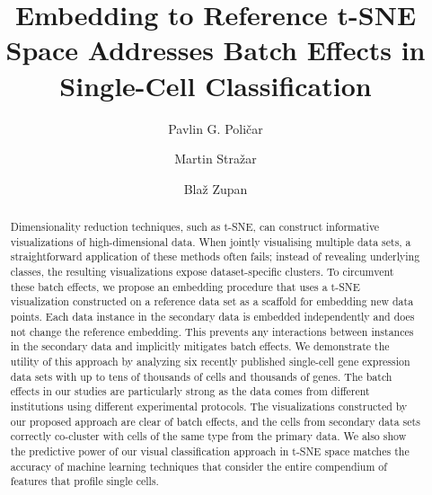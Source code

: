 \documentclass[runningheads]{llncs}
\begin{document}
%
\title{Embedding to Reference t-SNE Space Addresses Batch Effects in Single-Cell Classification}
%
%
\author{Pavlin G. Poli\v{c}ar \and
Martin Stra\v{z}ar \and
Bla\v{z} Zupan}
%
%

\maketitle

\begin{abstract}

Dimensionality reduction techniques, such as t-SNE, can construct informative visualizations of high-dimensional data. When jointly visualising multiple data sets, a straightforward application of these methods often fails; instead of revealing underlying classes, the resulting visualizations expose dataset-specific clusters. To circumvent these batch effects, we propose an embedding procedure that uses a t-SNE visualization constructed on a reference data set as a scaffold for embedding new data points. Each data instance in the secondary data is embedded independently and does not change the reference embedding. This prevents any interactions between instances in the secondary data and implicitly mitigates batch effects. We demonstrate the utility of this approach by analyzing six recently published single-cell gene expression data sets with up to tens of thousands of cells and thousands of genes. The batch effects in our studies are particularly strong as the data comes from different institutions using different experimental protocols. The visualizations constructed by our proposed approach are clear of batch effects, and the cells from secondary data sets correctly co-cluster with cells of the same type from the primary data. We also show the predictive power of our visual classification approach in t-SNE space matches the accuracy of machine learning techniques that consider the entire compendium of features that profile single cells.

\end{abstract}
\end{document}
